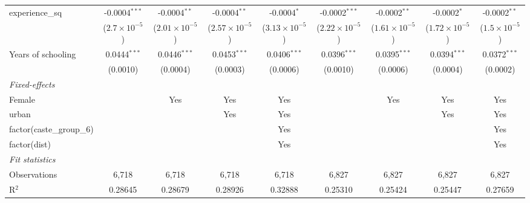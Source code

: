 \begin{table}[htbp]
{\begin{tabular}{lcccccccc}
      experience\_sq            & -0.0004$^{***}$        & -0.0004$^{**}$          & -0.0004$^{**}$          & -0.0004$^{*}$           & -0.0002$^{***}$         & -0.0002$^{**}$          & -0.0002$^{*}$           & -0.0002$^{**}$\\   
                                & ($2.7\times 10^{-5}$)  & ($2.01\times 10^{-5}$)  & ($2.57\times 10^{-5}$)  & ($3.13\times 10^{-5}$)  & ($2.22\times 10^{-5}$)  & ($1.61\times 10^{-5}$)  & ($1.72\times 10^{-5}$)  & ($1.5\times 10^{-5}$)\\    
      Years of schooling        & 0.0444$^{***}$         & 0.0446$^{***}$          & 0.0453$^{***}$          & 0.0406$^{***}$          & 0.0396$^{***}$          & 0.0395$^{***}$          & 0.0394$^{***}$          & 0.0372$^{***}$\\   
                                & (0.0010)               & (0.0004)                & (0.0003)                & (0.0006)                & (0.0010)                & (0.0006)                & (0.0004)                & (0.0002)\\   
      \midrule
      \emph{Fixed-effects}\\
      Female                    &                        & Yes                     & Yes                     & Yes                     &                         & Yes                     & Yes                     & Yes\\  
      urban                     &                        &                         & Yes                     & Yes                     &                         &                         & Yes                     & Yes\\  
      factor(caste\_group\_6)   &                        &                         &                         & Yes                     &                         &                         &                         & Yes\\  
      factor(dist)              &                        &                         &                         & Yes                     &                         &                         &                         & Yes\\  
      \midrule
      \emph{Fit statistics}\\
      Observations              & 6,718                  & 6,718                   & 6,718                   & 6,718                   & 6,827                   & 6,827                   & 6,827                   & 6,827\\  
      R$^2$                     & 0.28645                & 0.28679                 & 0.28926                 & 0.32888                 & 0.25310                 & 0.25424                 & 0.25447                 & 0.27659\\  

\end{tabular}}
\end{table}
